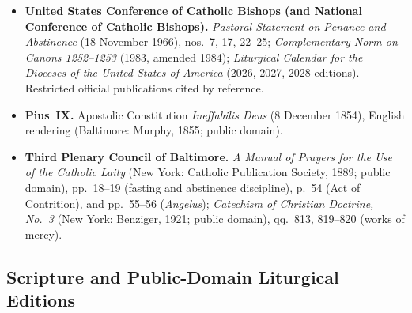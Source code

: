 \begin{itemize}
\item \textbf{United States Conference of Catholic Bishops (and National Conference of Catholic Bishops).} \textit{Pastoral Statement on Penance and Abstinence} (18 November 1966), nos.~7, 17, 22--25; \textit{Complementary Norm on Canons 1252--1253} (1983, amended 1984); \textit{Liturgical Calendar for the Dioceses of the United States of America} (2026, 2027, 2028 editions). Restricted official publications cited by reference.
\item \textbf{Pius~IX.} Apostolic Constitution \textit{Ineffabilis Deus} (8 December 1854), English rendering (Baltimore: Murphy, 1855; public domain).
\item \textbf{Third Plenary Council of Baltimore.} \textit{A Manual of Prayers for the Use of the Catholic Laity} (New York: Catholic Publication Society, 1889; public domain), pp.~18--19 (fasting and abstinence discipline), p.~54 (Act of Contrition), and pp.~55--56 (\textit{Angelus}); \textit{Catechism of Christian Doctrine, No.~3} (New York: Benziger, 1921; public domain), qq.~813, 819--820 (works of mercy).
\end{itemize}

\subsection*{Scripture and Public-Domain Liturgical Editions}

